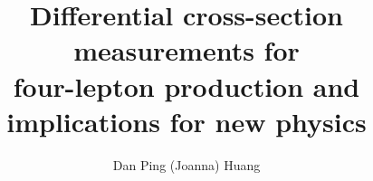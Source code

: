 \documentclass[hyperpdf,bindnopdf]{hepthesis}
\title{\Large Differential cross-section measurements
for \\ 
four-lepton production and implications for new physics}
\author{\large Dan Ping (Joanna) Huang}
\begin{document}
\begin{frontmatter}
  
%   
\end{frontmatter}

\begin{mainmatter}
  
  
  
  
  
  
\end{mainmatter}

\begin{appendices}
      
\end{appendices}

\begin{backmatter}
  
\end{backmatter}

\end{document}
